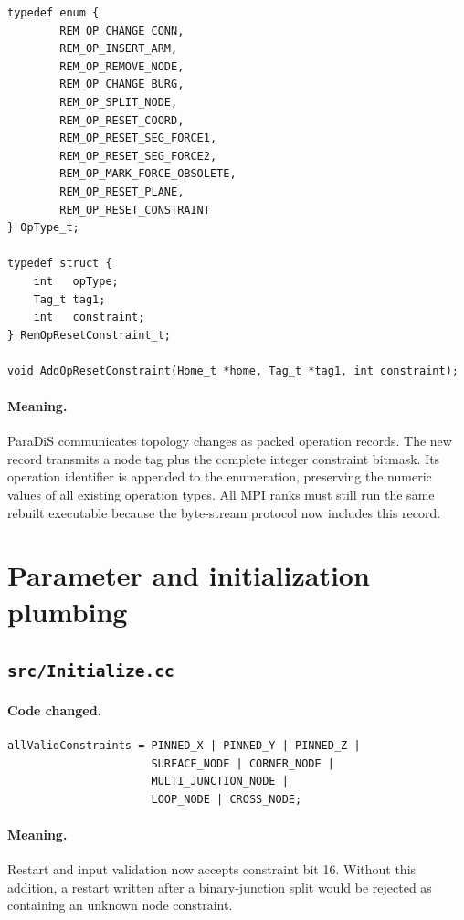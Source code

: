 \documentclass[11pt]{article}
\begin{document}
\begin{lstlisting}[style=cpp]
typedef enum {
        REM_OP_CHANGE_CONN,
        REM_OP_INSERT_ARM,
        REM_OP_REMOVE_NODE,
        REM_OP_CHANGE_BURG,
        REM_OP_SPLIT_NODE,
        REM_OP_RESET_COORD,
        REM_OP_RESET_SEG_FORCE1,
        REM_OP_RESET_SEG_FORCE2,
        REM_OP_MARK_FORCE_OBSOLETE,
        REM_OP_RESET_PLANE,
        REM_OP_RESET_CONSTRAINT
} OpType_t;

typedef struct {
    int   opType;
    Tag_t tag1;
    int   constraint;
} RemOpResetConstraint_t;

void AddOpResetConstraint(Home_t *home, Tag_t *tag1, int constraint);
\end{lstlisting}

\paragraph{Meaning.}
ParaDiS communicates topology changes as packed operation records.  The new
record transmits a node tag plus the complete integer constraint bitmask.  Its
operation identifier is appended to the enumeration, preserving the numeric
values of all existing operation types.  All MPI ranks must still run the
same rebuilt executable because the byte-stream protocol now includes this
record.

\section{Parameter and initialization plumbing}

\subsection{\texttt{src/Initialize.cc}}

\paragraph{Code changed.}

\begin{lstlisting}[style=cpp]
allValidConstraints = PINNED_X | PINNED_Y | PINNED_Z |
                      SURFACE_NODE | CORNER_NODE |
                      MULTI_JUNCTION_NODE |
                      LOOP_NODE | CROSS_NODE;
\end{lstlisting}

\paragraph{Meaning.}
Restart and input validation now accepts constraint bit 16.  Without this
addition, a restart written after a binary-junction split would be rejected as
containing an unknown node constraint.
\end{document}
